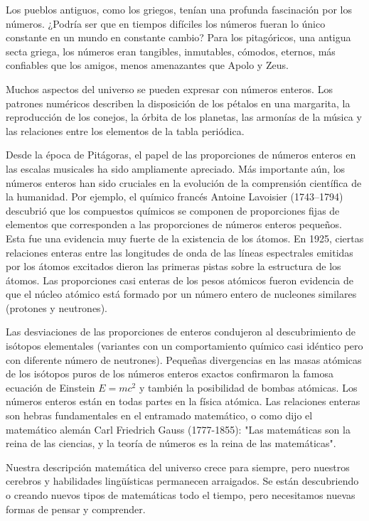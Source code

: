 \documentclass{article}
\begin{document}
Los pueblos antiguos, como los griegos, ten\'ian una profunda fascinaci\'on por los
n\'umeros. ¿Podr\'ia ser que en tiempos dif\'iciles los n\'umeros fueran lo \'unico
constante en un mundo en constante cambio? Para los pitag\'oricos, una antigua
secta griega, los n\'umeros eran tangibles, inmutables, c\'omodos, eternos, m\'as
confiables que los amigos, menos amenazantes que Apolo y Zeus.

Muchos aspectos del universo se pueden expresar con n\'umeros enteros. Los
patrones num\'ericos describen la disposici\'on de los p\'etalos en una margarita, la
reproducci\'on de los conejos, la \'orbita de los planetas, las armon\'ias de la
m\'usica y las relaciones entre los elementos de la tabla peri\'odica.

Desde la \'epoca de Pit\'agoras, el papel de las proporciones de n\'umeros enteros en
las escalas musicales ha sido ampliamente apreciado. M\'as importante a\'un, los
n\'umeros enteros han sido cruciales en la evoluci\'on de la comprensi\'on cient\'ifica
de la humanidad. Por ejemplo, el qu\'imico franc\'es Antoine Lavoisier (1743–1794)
descubri\'o que los compuestos qu\'imicos se componen de proporciones fijas de
elementos que corresponden a las proporciones de n\'umeros enteros peque\~nos. Esta
fue una evidencia muy fuerte de la existencia de los \'atomos. En 1925, ciertas
relaciones enteras entre las longitudes de onda de las l\'ineas espectrales
emitidas por los \'atomos excitados dieron las primeras pistas sobre la estructura
de los \'atomos. Las proporciones casi enteras de los pesos at\'omicos fueron
evidencia de que el n\'ucleo at\'omico est\'a formado por un n\'umero entero de
nucleones similares (protones y neutrones).

Las desviaciones de las proporciones de enteros condujeron al descubrimiento de
is\'otopos elementales (variantes con un comportamiento qu\'imico casi id\'entico pero
con diferente n\'umero de neutrones). Peque\~nas divergencias en las masas at\'omicas
de los is\'otopos puros de los n\'umeros enteros exactos confirmaron la famosa
ecuaci\'on de Einstein $E = mc^2$ y tambi\'en la posibilidad de bombas at\'omicas. Los
n\'umeros enteros est\'an en todas partes en la f\'isica at\'omica. Las relaciones
enteras son hebras fundamentales en el entramado matem\'atico, o como dijo el
matem\'atico alem\'an Carl Friedrich Gauss (1777-1855): "Las matem\'aticas son la
reina de las ciencias, y la teor\'ia de n\'umeros es la reina de las matem\'aticas".

Nuestra descripci\'on matem\'atica del universo crece para siempre, pero nuestros
cerebros y habilidades lingü\'isticas permanecen arraigados. Se est\'an descubriendo
o creando nuevos tipos de matem\'aticas todo el tiempo, pero necesitamos nuevas
formas de pensar y comprender. 
\end{document}
